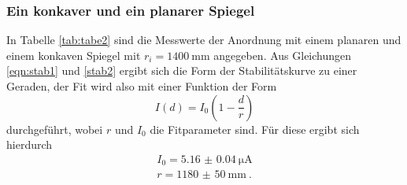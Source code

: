   \subsubsection{Ein konkaver und ein planarer Spiegel}

In Tabelle \ref{tab:tabe2} sind die Messwerte der Anordnung mit einem planaren und einem
konkaven Spiegel mit $r_i = \SI{1400}{\milli\meter}$ angegeben.
Aus Gleichungen \ref{eqn:stab1}
und \ref{stab2} ergibt sich die Form der Stabilitätskurve zu einer Geraden, der
Fit wird also mit einer Funktion der Form
\begin{equation}
  I(d)= I_0(1-\frac{d}{r})
\end{equation}
durchgeführt, wobei $r$ und $I_0$ die Fitparameter sind. Für diese ergibt sich hierdurch
\begin{align*}
  I_0= \SI{5.16(4)}{\micro\ampere} \\
  r=\SI{1180(50)}{\milli\meter} \: .
\end{align*}


\begin{minipage}{0.5\textwidth}

\end{minipage}
\begin{minipage}{0.2\textwidth}

\end{minipage}


